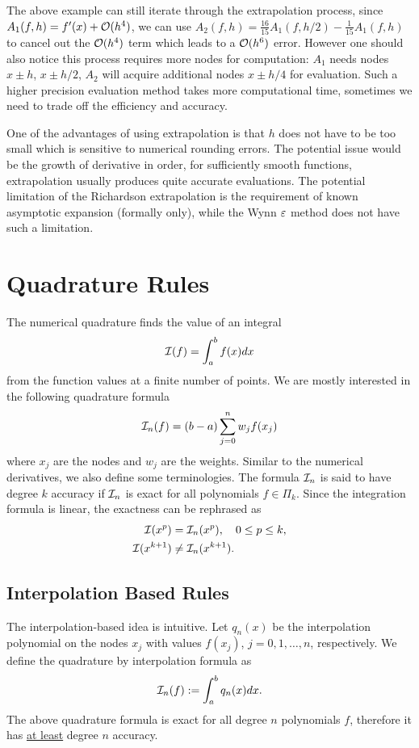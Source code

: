 The above example can still iterate through the extrapolation process, since $A_1(f, h) = f'(x) + \mathcal O(h^4)$, we can use $A_2(f, h) = \frac{16}{15}A_1(f, h/2) -  \frac{1}{15}A_1(f, h)$ to cancel out the $\mathcal O(h^4)$ term which leads to a $\mathcal O(h^6)$ error. However one should also notice this process requires more nodes for computation: $A_1$ needs nodes $x\pm h$, $x\pm h/2$, $A_2$ will acquire additional nodes $x\pm h/4$ for evaluation. Such a higher precision evaluation method takes more computational time, sometimes we need to trade off the efficiency and accuracy.

\begin{remark}
    One of the advantages of using extrapolation is that $h$ does not have to be too small which is sensitive to numerical rounding errors. The potential issue would be the growth of derivative in order, for sufficiently smooth functions, extrapolation usually produces quite accurate evaluations. The potential limitation of the Richardson extrapolation is the requirement of known asymptotic expansion (formally only), while the Wynn $\varepsilon$ method does not have such a limitation. 
\end{remark}


\section{Quadrature Rules}
\label{Sec: 3-Qua-Rul}
The numerical quadrature finds the value of an integral 
$$\mathcal I(f) = \int_a^b f(x) dx $$
from the function values at a finite number of points. We are mostly interested in the following quadrature formula 
\begin{equation}
    \mathcal I_n(f) = (b - a) \sum_{j=0}^n w_j f(x_j)
\end{equation}
where $x_j$ are the nodes and $w_j$ are the weights. Similar to the numerical derivatives, we also define some terminologies. The formula $\mathcal I_n$ is said to have degree $k$ accuracy if $\mathcal I_n$ is exact for all polynomials $f\in\Pi_k$. Since the integration formula is linear, the exactness can be rephrased as 
\begin{equation}
    \begin{aligned}
        \mathcal I(x^p) &= \mathcal I_n(x^p),\quad 0\le p \le k, \\
        \mathcal I(x^{k+1}) &\neq \mathcal I_n(x^{k+1}) .   
    \end{aligned}
\end{equation}

\subsection{Interpolation Based Rules}
\label{SSec: 3-Int-Bas-Rul}
The interpolation-based idea is intuitive. Let $q_n(x)$ be the interpolation polynomial on the nodes $x_j$ with values $f(x_j)$, $j=0,1,\dots, n$, respectively. We define the quadrature by interpolation formula as 
\begin{equation}
    \mathcal I_n(f):= \int_a^b q_n(x) dx.
\end{equation}
The above quadrature formula is exact for all degree $n$ polynomials $f$, therefore it has \underline{at least} degree $n$ accuracy. 

